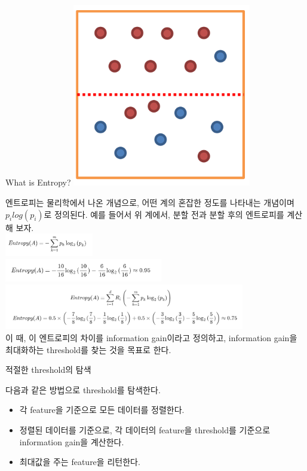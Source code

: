 \documentclass{beamer}
\begin{document}
\begin{frame}{What is Entropy?}
\includegraphics[height=8cm,keepaspectratio]{entropy}

\end{frame}

\begin{frame} 

엔트로피는 물리학에서 나온 개념으로, 어떤 계의 혼잡한 정도를 나타내는 개념이며 $p_i log (p_i)$로 정의된다. 예를 들어서 위 계에서, 분할 전과 분할 후의 엔트로피를 계산해 보자. \\
\includegraphics[height=1cm,keepaspectratio]{ent0} \\
\includegraphics[height=1cm,keepaspectratio]{ent1}\\
\includegraphics[height=2cm,keepaspectratio]{ent2}\\

이 때, 이 엔트로피의 차이를 information gain이라고 정의하고, information gain을 최대화하는 threshold를 찾는 것을 목표로 한다. 
\end{frame}

\begin{frame}{적절한 threshold의 탐색}

다음과 같은 방법으로 threshold를 탐색한다. 

\begin{itemize} 
\item 각 feature을 기준으로 모든 데이터를 정렬한다. 
\item 정렬된 데이터를 기준으로, 각 데이터의 feature을 threshold를 기준으로 information gain을 계산한다. 
\item 최대값을 주는 feature을 리턴한다. 
\end{itemize}

\end{frame}
\end{document}
